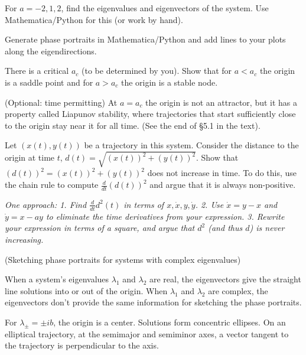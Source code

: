 \documentclass[12pt,letterpaper]{exam}
\begin{document}
\begin{questions}
\begin{parts}
 \item For $a = -2, 1, 2$, find the eigenvalues and eigenvectors of the system.  Use Mathematica/Python for this (or work by hand).


 Generate phase portraits in Mathematica/Python and add lines to your plots along the eigendirections.


	\item There is a critical $a_c$ (to be determined by you).   Show that for $a<a_c$ the origin is a saddle point and for $a>a_c$ the origin is a stable node. 

 \item (Optional: time permitting) At $a=a_c$ the origin is not an attractor, but it has a property called Liapunov stability, where trajectories that start sufficiently close to the origin stay near it for all time.  (See the end of \S 5.1 in the text).

Let $(x(t),y(t))$ be a trajectory in this system.  Consider the distance to the origin at time $t$, $d(t) = \sqrt{(x(t))^2 + (y(t))^2}$.  Show that $(d(t))^2 = (x(t))^2 + (y(t))^2$ does not increase in time.  To do this, use the chain rule to compute $\frac{d}{dt} (d(t))^2$ and argue that it is always non-positive.

\emph{One approach: 1. Find $\frac{d}{dt} d^2(t)$ in terms of $x, \dot x, y, \dot y$.  2. Use $\dot x = y - x$ and $\dot y = x-ay$ to eliminate the time derivatives from your expression. 3. Rewrite your expression in terms of a square, and argue that $d^2$ (and thus $d$) is never increasing.}
 
\end{parts}
\item (Sketching phase portraits for systems with complex eigenvalues) 

When a system's eigenvalues $\lambda_1$ and $\lambda_2$ are real, the eigenvectors give the straight line solutions into or out of the origin.  When $\lambda_1$ and $\lambda_2$ are complex, the eigenvectors don't provide the same information for sketching the phase portraits.

For $\lambda_\pm=\pm ib$, the origin is a center.  Solutions form concentric ellipses.  On an elliptical trajectory, at the semimajor and semiminor axes, a vector tangent to the trajectory is perpendicular to the axis.


\end{questions}
\end{document}

